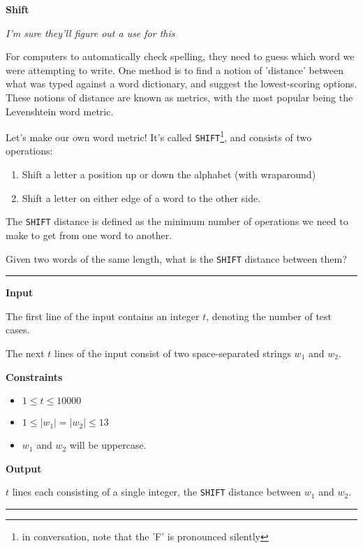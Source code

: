 \LARGE {} \textbf{Shift} \normalsize

{\itshape I'm sure they'll figure out a use for this}

For computers to automatically check spelling, 
they need to guess which word we were attempting to write.
One method is to find a notion of 'distance' between what was typed against a word dictionary, and suggest the lowest-scoring options.
These notions of distance are known as metrics, with the most popular being the Levenshtein word metric.

Let's make our own word metric! It's called \texttt{SHIFT}\footnote{in conversation, note that the 'F' is pronounced silently}, and consists of two operations:

\begin{enumerate}
    \item Shift a letter a position up or down the alphabet (with wraparound)
    \item Shift a letter on either edge of a word to the other side.
\end{enumerate}

The \texttt{SHIFT} distance is defined as the minimum number of operations we need to make to get from one word to another.

Given two words of the same length, what is the \texttt{SHIFT} distance between them?

\vspace{8pt}
\hrule

\textbf{Input}

The first line of the input contains an integer $t$, denoting the number of test cases.

The next $t$ lines of the input consist of two space-separated strings $w_1$ and $w_2$.

\textbf{Constraints}

\begin{itemize}
    \item $1 \leq t \leq 10000$
    \item $1 \leq |w_1| = |w_2| \leq 13$
    \item $w_1$ and $w_2$ will be uppercase.
\end{itemize}

\textbf{Output}

$t$ lines each consisting of a single integer, the \texttt{SHIFT} distance between $w_1$ and $w_2$.

\vspace{8pt}
\hrule

